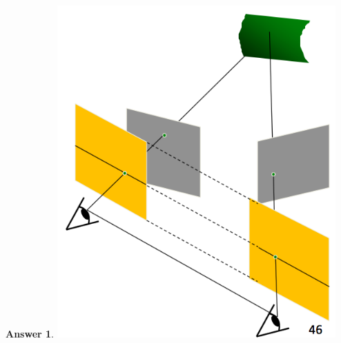 \documentclass[a4paper,12 pt]{article}
\theoremstyle{definition}
\theoremstyle{remark}
\theoremstyle{definition}
\theoremstyle{definition}
\theoremstyle{definition}
\theoremstyle{definition}
\theoremstyle{remark}
\theoremstyle{remark}
\theoremstyle{definition}
\theoremstyle{definition}
\newtheorem*{answer}{Answer}
\begin{document}
\begin{enumerate}
\begin{answer}
\begin{minipage}{0.3 \columnwidth}
\includegraphics[width=0.8\textwidth]{pics/rectif}\label{fig:rectif}
\end{minipage}


\end{answer}
\end{enumerate}
\end{document}
